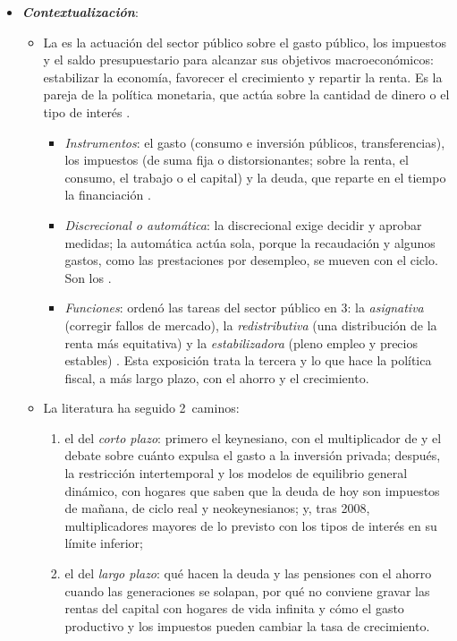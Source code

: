 \documentclass[11pt]{article}
\begin{document}
\begin{itemize}
\item \textbf{\emph{Contextualización}}:
  \begin{itemize}
  \item La  es la actuación del sector público sobre el gasto público, los impuestos y el saldo presupuestario para alcanzar sus objetivos macroeconómicos: estabilizar la economía, favorecer el crecimiento y repartir la renta. Es la pareja de la política monetaria, que actúa sobre la cantidad de dinero o el tipo de interés .
    \begin{itemize}
    \item \emph{Instrumentos}: el gasto (consumo e inversión públicos, transferencias), los impuestos (de suma fija o distorsionantes; sobre la renta, el consumo, el trabajo o el capital) y la deuda, que reparte en el tiempo la financiación .
    \item \emph{Discrecional o automática}: la discrecional exige decidir y aprobar medidas; la automática actúa sola, porque la recaudación y algunos gastos, como las prestaciones por desempleo, se mueven con el ciclo. Son los  .
    \item \emph{Funciones}: \textcite{Musgrave1959Theory} ordenó las tareas del sector público en 3: la \emph{asignativa} (corregir fallos de mercado), la \emph{redistributiva} (una distribución de la renta más equitativa) y la \emph{estabilizadora} (pleno empleo y precios estables) . Esta exposición trata la tercera y lo que hace la política fiscal, a más largo plazo, con el ahorro y el crecimiento.
    \end{itemize}
  \item La literatura ha seguido 2~caminos:
    \begin{enumerate}
    \item el del \emph{corto plazo}: primero el keynesiano, con el multiplicador de \textcite{Kahn1931Relation} y el debate sobre cuánto expulsa el gasto a la inversión privada; después, la restricción intertemporal y los modelos de equilibrio general dinámico, con hogares que saben que la deuda de hoy son impuestos de mañana\nocite{Barro1974}, de ciclo real\nocite{BaxterKing1993Fiscal} y neokeynesianos\nocite{Woodford2011Simple}; y, tras 2008, multiplicadores mayores de lo previsto con los tipos de interés en su límite inferior\nocite{BlanchardLeigh2013Growth};
    \item el del \emph{largo plazo}: qué hacen la deuda y las pensiones con el ahorro cuando las generaciones se solapan\nocite{Diamond1965National}, por qué no conviene gravar las rentas del capital con hogares de vida infinita\nocite{Chamley1986Optimal,Judd1985Redistributive} y cómo el gasto productivo y los impuestos pueden cambiar la tasa de crecimiento\nocite{Barro1990,Rebelo1991Long}.
    \end{enumerate}
  \end{itemize}


\end{itemize}
\end{document}
